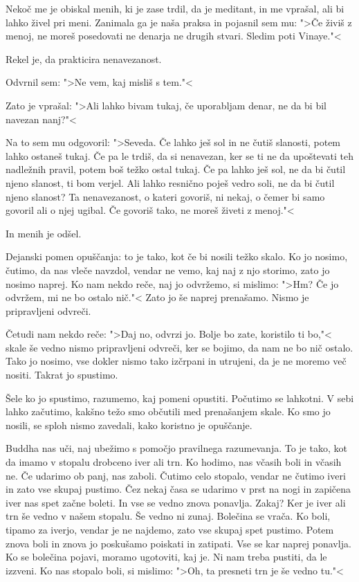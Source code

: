 \clearpage


Nekoč me je obiskal menih, ki je zase trdil, da je meditant, in me vprašal, ali bi lahko živel pri meni. Zanimala ga je naša praksa in pojasnil sem mu: ">Če živiš z menoj, ne moreš posedovati ne denarja ne drugih stvari. Sledim poti Vinaye."<

Rekel je, da prakticira nenavezanost.

Odvrnil sem: ">Ne vem, kaj misliš s tem."<

Zato je vprašal: ">Ali lahko bivam tukaj, če uporabljam denar, ne da bi bil navezan nanj?"<

Na to sem mu odgovoril: ">Seveda. Če lahko ješ sol in ne čutiš slanosti, potem lahko ostaneš tukaj. Če pa le trdiš, da si nenavezan, ker se ti ne da upoštevati teh nadležnih pravil, potem boš težko ostal tukaj. Če pa lahko ješ sol, ne da bi čutil njeno slanost, ti bom verjel. Ali lahko resnično poješ vedro soli, ne da bi čutil njeno slanost? Ta nenavezanost, o kateri govoriš, ni nekaj, o čemer bi samo govoril ali o njej ugibal. Če govoriš tako, ne moreš živeti z menoj."<

In menih je odšel.

\clearpage


Dejanski pomen opuščanja: to je tako, kot če bi nosili težko skalo. Ko jo nosimo, čutimo, da nas vleče navzdol, vendar ne vemo, kaj naj z njo storimo, zato jo nosimo naprej. Ko nam nekdo reče, naj jo odvržemo, si mislimo: ">Hm? Če jo odvržem, mi ne bo ostalo nič."< Zato jo še naprej prenašamo. Nismo je pripravljeni odvreči.

Četudi nam nekdo reče: ">Daj no, odvrzi jo. Bolje bo zate, koristilo ti bo,"< skale še vedno nismo pripravljeni odvreči, ker se bojimo, da nam ne bo nič ostalo. Tako jo nosimo, vse dokler nismo tako izčrpani in utrujeni, da je ne moremo več nositi. Takrat jo spustimo.

Šele ko jo spustimo, razumemo, kaj pomeni opustiti. Počutimo se lahkotni. V sebi lahko začutimo, kakšno težo smo občutili med prenašanjem skale. Ko smo jo nosili, se sploh nismo zavedali, kako koristno je opuščanje.

\clearpage


Buddha nas uči, naj ubežimo s pomočjo pravilnega razumevanja. To je tako, kot da imamo v stopalu drobceno iver ali trn. Ko hodimo, nas včasih boli in včasih ne. Če udarimo ob panj, nas zaboli. Čutimo celo stopalo, vendar ne čutimo iveri in zato vse skupaj pustimo. Čez nekaj časa se udarimo v prst na nogi in zapičena iver nas spet začne boleti. In vse se vedno znova ponavlja. Zakaj? Ker je iver ali trn še vedno v našem stopalu. Še vedno ni zunaj. Bolečina se vrača. Ko boli, tipamo za iverjo, vendar je ne najdemo, zato vse skupaj spet pustimo. Potem znova boli in znova jo poskušamo poiskati in zatipati. Vse se kar naprej ponavlja. Ko se bolečina pojavi, moramo ugotoviti, kaj je. Ni nam treba pustiti, da le izzveni. Ko nas stopalo boli, si mislimo: ">Oh, ta presneti trn je še vedno tu."<

